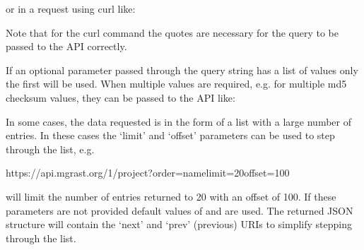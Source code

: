 \documentclass[letterpaper,10pt,english]{sphinxmanual}
\begin{document}
or in a request using curl like:

\begin{sphinxVerbatim}[commandchars=\\\{\}]
     
\end{sphinxVerbatim}

Note that for the curl command the quotes are necessary for the query to
be passed to the API correctly.

If an optional parameter passed through the query string has a list of
values only the first will be used. When multiple values are required,
e.g. for multiple md5 checksum values, they can be passed to the API
like:

\begin{sphinxVerbatim}[commandchars=\\\{\}]
    \PYG{l+s+s1}{:[}\PYG{l+s+s1}{]\PYGZcb{}} 
\end{sphinxVerbatim}

In some cases, the data requested is in the form of a list with a large
number of entries. In these cases the ‘limit’ and ‘offset’ parameters
can be used to step through the list, e.g.

\begin{sphinxVerbatim}[commandchars=\\\{\}]
https://api.mg\PYGZhy{}rast.org/1/project?order=name\PYGZam{}limit=20\PYGZam{}offset=100
\end{sphinxVerbatim}

will limit the number of entries returned to 20 with an offset of 100.
If these parameters are not provided default values of  and
 are used. The returned JSON structure will contain the
‘next’ and ‘prev’ (previous) URIs to simplify stepping through the list.
\end{document}
